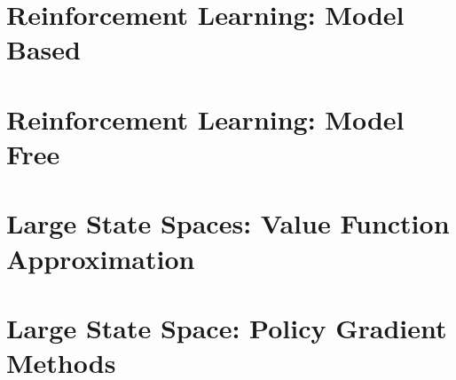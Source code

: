 \documentclass[12pt]{book}
\begin{document}

\chapter{Reinforcement Learning: Model Based}\label{chapter-model-based}

%



\chapter{Reinforcement Learning: Model Free}
\label{chapter:learning-model-free}

\newpage

%


\chapter{Large State Spaces: Value Function Approximation}
\label{chapter:function-approximation}

%
%

\chapter{Large State Space: Policy Gradient Methods}
\label{chapter:policy-gradient}



\end{document}
